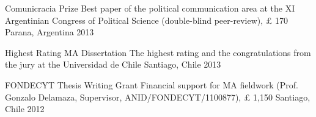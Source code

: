 \vspace{1mm}

\begin{cvhonors}
\cvhonor
{Comunicracia Prize}
{Best paper of the political communication area at the XI Argentinian Congress of Political Science (double-blind peer-review), {\pounds} 170}
{Parana, Argentina}
{2013}
\end{cvhonors}

\vspace{1mm}

\begin{cvhonors}
\cvhonor
{Highest Rating MA Dissertation}
{The highest rating and the congratulations from the jury at the Universidad de Chile}
{Santiago, Chile}
{2013}
\end{cvhonors}

\vspace{1mm}

\begin{cvhonors}
\cvhonor
{FONDECYT Thesis Writing Grant}
{Financial support for MA fieldwork (Prof. Gonzalo Delamaza, Supervisor, ANID/FONDECYT/1100877), {\pounds} 1,150}
{Santiago, Chile}
{2012}
\end{cvhonors}

\vspace{1mm}

